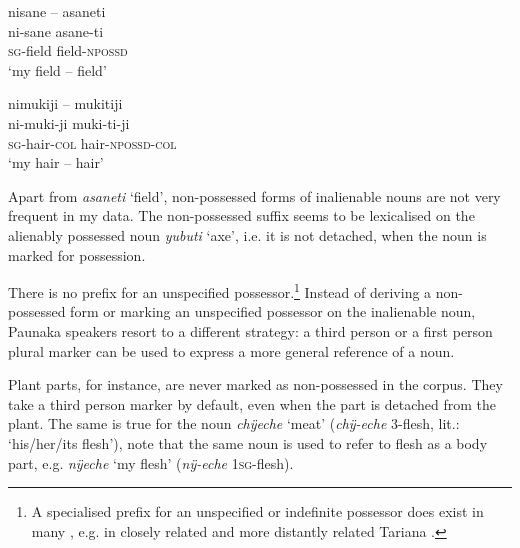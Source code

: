 \ea\label{ex:sane-asaneti}
\begingl 
\glpreamble nisane – asaneti\\
\gla ni-sane asane-ti\\ 
\textsc{sg}-field field-\textsc{npossd}\\ 
\glft ‘my field – field’
\xe

\ea\label{ex:mukiji-mukitiji}
\begingl 
\glpreamble nimukiji – mukitiji\\
\gla ni-muki-ji muki-ti-ji\\ 
\textsc{sg}-hair-\textsc{col} hair-\textsc{npossd}-\textsc{col}\\ 
\glft ‘my hair – hair’
\xe

%
Apart from \textit{asaneti} ‘field’, non-possessed forms of inalienable nouns are not very frequent in my data. The non-possessed suffix seems to be lexicalised on the alienably possessed noun \textit{yubuti} ‘axe’, i.e. it is not detached, when the noun is marked for possession.

There is no prefix for an unspecified possessor.\footnote{A specialised prefix for an unspecified or indefinite possessor does exist in many , e.g. in closely related   \citep[119--120]{Danielsen2007} and more distantly related Tariana \citep[123]{Aikhenvald2003}.} %
Instead of deriving a non-possessed form or marking an unspecified possessor on the inalienable noun, Paunaka speakers resort to a different strategy: a third person or a first person plural marker can be used to express a more general reference of a noun. 

Plant parts, for instance, are never marked as non-possessed in the corpus. They take a third person marker by default, even when the part is detached from the plant. The same is true for the noun \textit{chÿeche} ‘meat’ (\textit{chÿ-eche} 3-flesh, lit.: ‘his/her/its flesh’), note that the same noun is used to refer to flesh as a body part, e.g. \textit{nÿeche} ‘my flesh’ (\textit{nÿ-eche} 1\textsc{sg}-flesh).

